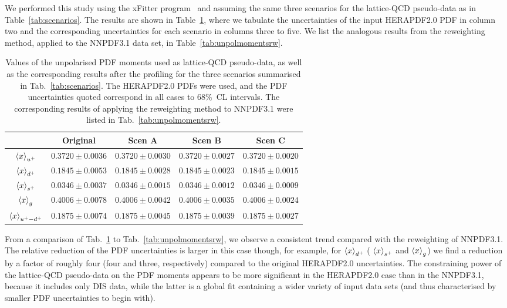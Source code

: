 We performed this study using the xFitter program~\cite{Alekhin:2014irh}
and assuming the same three scenarios for the lattice-QCD pseudo-data as 
in Table~\ref{tab:scenarios}. 
%
The results are shown in Table~\ref{tab:unpolmomentsProf}, where we tabulate 
the uncertainties of the input HERAPDF2.0 PDF in column two and the 
corresponding uncertainties for each scenario in columns three to five. 
%
We list the analogous results from the reweighting method, applied to the 
NNPDF3.1 data set, in Table~\ref{tab:unpolmomentsrw}.


\begin{table}[h]
  \centering
  \renewcommand{\arraystretch}{1.3} 
\begin{tabular}{c||c|c|c|c}
  \hline &  Original  & Scen A  &  Scen B  &  Scen C  \\
  \hline
  \hline
  $\left\langle x\right\rangle_{u^+}$     &  $0.3720\pm 0.0036$  &  $0.3720\pm 0.0030$  &  $0.3720\pm 0.0027$  &  $0.3720\pm 0.0020$ \\
  $\left\langle x\right\rangle_{d^+}$     &  $0.1845\pm 0.0053$  &  $0.1845\pm 0.0028$  &  $0.1845\pm 0.0023$  &  $0.1845\pm 0.0015$ \\
  $\left\langle x\right\rangle_{s^+}$     &  $0.0346\pm 0.0037$  &  $0.0346\pm 0.0015$  &  $0.0346\pm 0.0012$  &  $0.0346\pm 0.0009$ \\
  $\left\langle x\right\rangle_{g}$       &  $0.4006\pm 0.0078$  &  $0.4006\pm 0.0042$  &  $0.4006\pm 0.0035$  &  $0.4006\pm 0.0024$ \\
  $\left\langle x\right\rangle_{u^+-d^+}$ &  $0.1875\pm 0.0074$  &  $0.1875\pm 0.0045$  &  $0.1875\pm 0.0039$  &  $0.1875\pm 0.0027$ \\
  \hline
\end{tabular}
\caption{\small Values of the unpolarised PDF moments
  used as lattice-QCD pseudo-data, as well as the corresponding results
  after the profiling  for the
three scenarios summarised in Tab.~\ref{tab:scenarios}.
%
The HERAPDF2.0 PDFs were used, and the PDF uncertainties quoted correspond in all cases to 68\%~CL intervals.
%
The corresponding results of applying the reweighting method
to NNPDF3.1 were listed in Tab.~\ref{tab:unpolmomentsrw}.
\label{tab:unpolmomentsProf}
}
\end{table}

From a comparison of Tab.~\ref{tab:unpolmomentsProf} to Tab.~\ref{tab:unpolmomentsrw},
we observe a consistent trend compared with the reweighting of NNPDF3.1.
%
The relative reduction of the PDF uncertainties is larger
in this case though, for example, for $\left\langle x\right\rangle_{d^+}$ ( $\left\langle x\right\rangle_{s^+}$
and  $\left\langle x\right\rangle_g$) we find a reduction by a factor of roughly
four (four and three, respectively) compared to the original
HERAPDF2.0 uncertainties.
%
The constraining power of the lattice-QCD pseudo-data
on the PDF moments appears to be more significant in the
HERAPDF2.0 case than in the NNPDF3.1, because it includes only DIS data, while the latter
is a global fit containing a wider variety of
input data sets (and thus characterised by smaller
PDF uncertainties to begin with).

